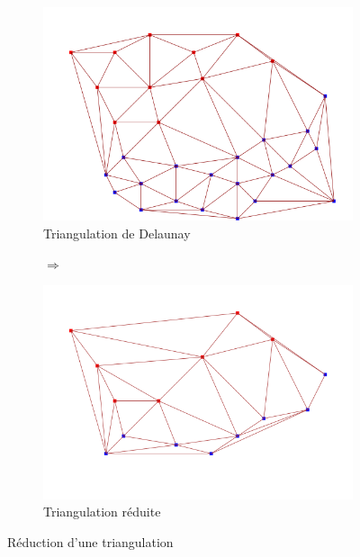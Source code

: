 \begin{figure}[ht]
\centering
\begin{subfigure}{0.4\textwidth}
  \centering
  \includegraphics[width=\textwidth]{figures/delaunay.png}
  \caption{Triangulation de Delaunay}
  \label{fig::delaunay_tr}
\end{subfigure}%
\begin{subfigure}{0.2\textwidth}
  \centering
  $\Longrightarrow$
\end{subfigure}%
\begin{subfigure}{0.4\textwidth}
  \centering
  \includegraphics[width=\textwidth]{figures/delaunay_reduced.png}
  \caption{Triangulation réduite}
  \label{fig::delaunay_reduced}
\end{subfigure}
\caption{Réduction d'une triangulation}
\label{fig::delaunays}
\end{figure}

